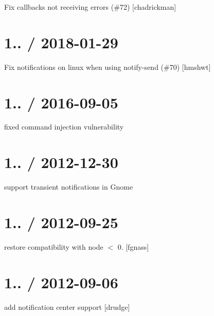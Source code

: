 
\begin{DoxyItemize}
\item Fix callbacks not receiving errors (\#72) \mbox{[}chadrickman\mbox{]}
\end{DoxyItemize}

\section*{1.. / 2018-\/01-\/29 }


\begin{DoxyItemize}
\item Fix notifications on linux when using notify-\/send (\#70) \mbox{[}hmshwt\mbox{]}
\end{DoxyItemize}

\section*{1.. / 2016-\/09-\/05 }


\begin{DoxyItemize}
\item fixed command injection vulnerability
\end{DoxyItemize}

\section*{1.. / 2012-\/12-\/30 }


\begin{DoxyItemize}
\item support transient notifications in Gnome
\end{DoxyItemize}

\section*{1.. / 2012-\/09-\/25 }


\begin{DoxyItemize}
\item restore compatibility with node $<$ 0. \mbox{[}fgnass\mbox{]}
\end{DoxyItemize}

\section*{1.. / 2012-\/09-\/06 }


\begin{DoxyItemize}
\item add notification center support \mbox{[}drudge\mbox{]}
\end{DoxyItemize}

